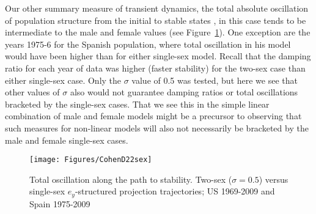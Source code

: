 Our other summary measure of transient dynamics, the total absolute
oscillation of population structure from the initial to stable states
\citep{cohen1979cumulative}, in this case tends to be intermediate to the male
and female values (see Figure~\ref{fig:cohend22sex}). One exception are the
years 1975-6 for the Spanish population, where total oscillation in his model
would have been higher than for either single-sex model. Recall that the damping
ratio for each year of data was higher (faster stability) for the two-sex case 
than either single-sex case. Only the $\sigma$ value of 0.5 was tested, but here
we see that other values of $\sigma$ also would not guarantee damping ratios or
total oscillations bracketed by the single-sex cases. That we see this in the
simple linear combination of male and female models might be a precursor to
observing that such measures for non-linear models will also not necessarily be
bracketed by the male and female single-sex cases.

\begin{figure}[ht!]
        \centering  
          \caption{Total oscillation along the path to
       stability. Two-sex ($\sigma = 0.5$) versus single-sex $e_y$-structured
       projection trajectories; US 1969-2009 and Spain 1975-2009}
           \texttt{[image: Figures/CohenD22sex]}
          \label{fig:cohend22sex}
\end{figure}
 \FloatBarrier





